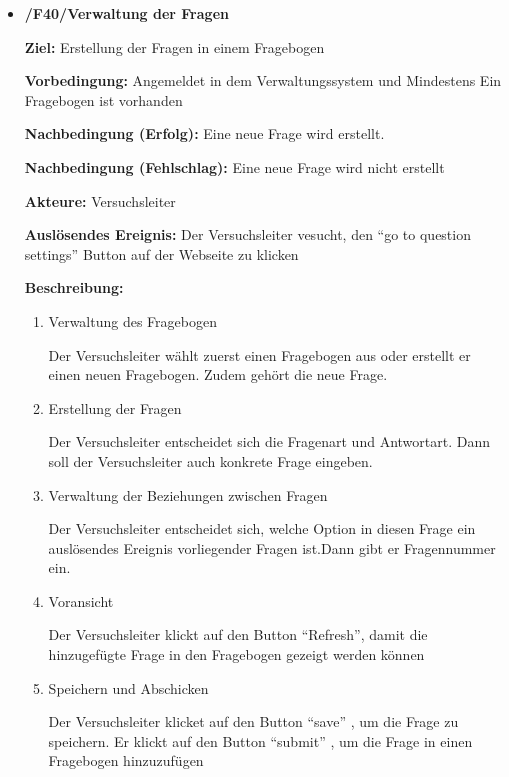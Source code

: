 \documentclass[a4paper]{scrreprt}
\begin{document}
\begin{itemize}
                \item \textbf{/F40/Verwaltung der Fragen }
                \par \textbf{Ziel: }Erstellung der Fragen in einem Fragebogen
                \par \textbf{Vorbedingung: } Angemeldet in dem Verwaltungssystem und Mindestens Ein Fragebogen ist vorhanden
                \par \textbf{Nachbedingung (Erfolg): }Eine neue Frage wird erstellt.
                \par \textbf{Nachbedingung (Fehlschlag): }Eine neue Frage wird nicht erstellt
                \par \textbf{Akteure: }Versuchsleiter
                \par \textbf{Auslösendes Ereignis: }Der Versuchsleiter vesucht, den ``go to question settings'' Button auf der Webseite zu klicken
                \par \textbf{Beschreibung: }
                \begin{enumerate}
                    \item Verwaltung des Fragebogen
                    \par Der Versuchsleiter wählt zuerst einen Fragebogen aus oder erstellt er einen neuen Fragebogen. Zudem gehört die neue Frage.
                    \item Erstellung der Fragen
                    \par Der Versuchsleiter entscheidet sich die Fragenart und Antwortart. Dann soll der Versuchsleiter auch konkrete Frage eingeben.
                    \item Verwaltung der Beziehungen zwischen Fragen
                    \par Der Versuchsleiter entscheidet sich, welche Option in diesen Frage ein auslösendes Ereignis vorliegender Fragen ist.Dann gibt er Fragennummer ein.
                    \item Voransicht
                    \par Der Versuchsleiter klickt auf den Button ``Refresh'', damit die hinzugefügte Frage in den Fragebogen gezeigt werden können
                    \item Speichern und Abschicken
                    \par Der Versuchsleiter klicket auf den Button ``save'' , um die Frage zu speichern. Er klickt auf den Button ``submit'' , um die Frage in einen Fragebogen hinzuzufügen
                \end{enumerate}

\end{itemize}
\end{document}
